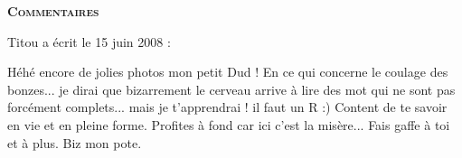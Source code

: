 \bigskip
\textbf{\textsc{Commentaires}}

\medskip
Titou a écrit le 15 juin 2008 :
\begin{displayquote}
Héhé encore de jolies photos mon petit Dud !
En ce qui concerne le coulage des bonzes... je dirai que bizarrement le cerveau arrive à lire des mot qui ne sont pas forcément complets... mais je t'apprendrai ! il faut un R :) Content de te savoir en vie et en pleine forme. Profites à fond car ici c'est la misère...
Fais gaffe à toi et à plus.
Biz mon pote.
\end{displayquote}

\vfill
